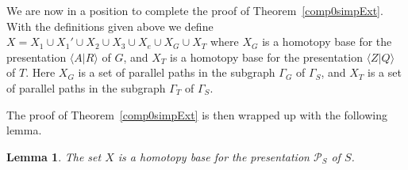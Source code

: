 \documentclass[11pt]{amsart}
\newtheorem{lem}{Lemma}
\theoremstyle{plain}
\begin{document}
We are now in a position to complete the proof of Theorem~\ref{comp0simpExt}. With the definitions given above we define $X = X_1 \cup X_1' \cup X_2 \cup X_3 \cup X_e \cup X_G \cup X_T$ where $X_G$ is a homotopy base for the presentation ${\langle} A | R {\rangle}$ of $G$, and $X_T$ is a homotopy base for the presentation ${\langle} Z | Q {\rangle}$ of $T$. Here $X_G$ is a set of parallel paths in the subgraph $\Gamma_G$ of $\Gamma_S$, and $X_T$ is a set of parallel paths in the subgraph $\Gamma_T$ of $\Gamma_S$.    

The proof of Theorem~\ref{comp0simpExt} is then wrapped up with the following lemma.

\begin{lem}\label{wrappingup}
The set $X$ is a homotopy base for the presentation $\mathcal{P}_S$ of $S$.  
\end{lem}
\end{document}

